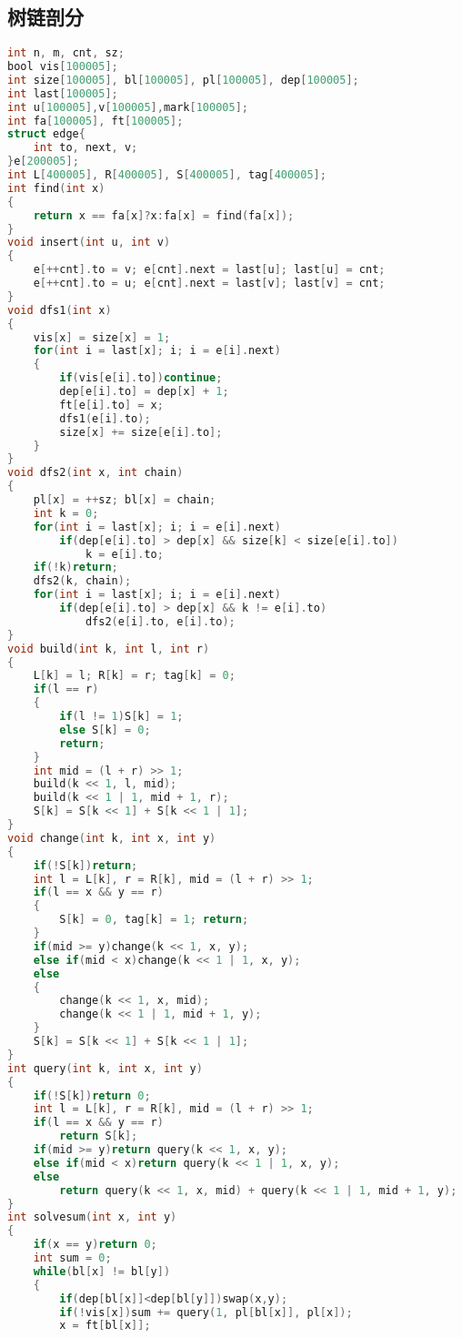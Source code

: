 \subsection{树链剖分}
\begin{lstlisting}[language=C]
int n, m, cnt, sz;
bool vis[100005];
int size[100005], bl[100005], pl[100005], dep[100005];
int last[100005];
int u[100005],v[100005],mark[100005];
int fa[100005], ft[100005];
struct edge{
    int to, next, v;
}e[200005];
int L[400005], R[400005], S[400005], tag[400005];
int find(int x)
{
    return x == fa[x]?x:fa[x] = find(fa[x]);
}
void insert(int u, int v)
{
    e[++cnt].to = v; e[cnt].next = last[u]; last[u] = cnt;
    e[++cnt].to = u; e[cnt].next = last[v]; last[v] = cnt;
}
void dfs1(int x)
{
    vis[x] = size[x] = 1;
    for(int i = last[x]; i; i = e[i].next)
    {
        if(vis[e[i].to])continue;
        dep[e[i].to] = dep[x] + 1;
        ft[e[i].to] = x;       
        dfs1(e[i].to);
        size[x] += size[e[i].to];
    }
}
void dfs2(int x, int chain)
{
    pl[x] = ++sz; bl[x] = chain;
    int k = 0;
    for(int i = last[x]; i; i = e[i].next)
        if(dep[e[i].to] > dep[x] && size[k] < size[e[i].to])
            k = e[i].to;
    if(!k)return;
    dfs2(k, chain);
    for(int i = last[x]; i; i = e[i].next)
        if(dep[e[i].to] > dep[x] && k != e[i].to)
            dfs2(e[i].to, e[i].to);
}
void build(int k, int l, int r)
{
    L[k] = l; R[k] = r; tag[k] = 0;
    if(l == r)
    {
        if(l != 1)S[k] = 1;
        else S[k] = 0;
        return;
    }
    int mid = (l + r) >> 1;
    build(k << 1, l, mid);
    build(k << 1 | 1, mid + 1, r);
    S[k] = S[k << 1] + S[k << 1 | 1];
}
void change(int k, int x, int y)
{
    if(!S[k])return;
    int l = L[k], r = R[k], mid = (l + r) >> 1;
    if(l == x && y == r)
    {
        S[k] = 0, tag[k] = 1; return;
    }
    if(mid >= y)change(k << 1, x, y);
    else if(mid < x)change(k << 1 | 1, x, y);
    else
    {
        change(k << 1, x, mid);
        change(k << 1 | 1, mid + 1, y);
    }
    S[k] = S[k << 1] + S[k << 1 | 1];
}
int query(int k, int x, int y)
{
    if(!S[k])return 0;
    int l = L[k], r = R[k], mid = (l + r) >> 1;
    if(l == x && y == r)
        return S[k];
    if(mid >= y)return query(k << 1, x, y);
    else if(mid < x)return query(k << 1 | 1, x, y);
    else
        return query(k << 1, x, mid) + query(k << 1 | 1, mid + 1, y);
}
int solvesum(int x, int y)
{
    if(x == y)return 0;
    int sum = 0;
    while(bl[x] != bl[y])
    {
        if(dep[bl[x]]<dep[bl[y]])swap(x,y);
        if(!vis[x])sum += query(1, pl[bl[x]], pl[x]);
        x = ft[bl[x]];

\end{lstlisting}
